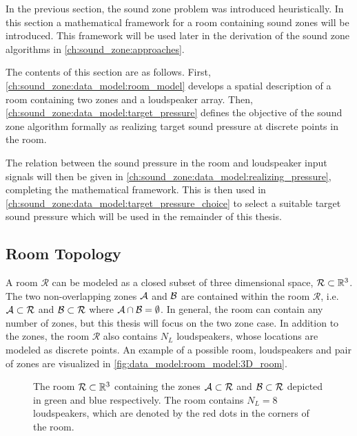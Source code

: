In the previous section, the sound zone problem was introduced heuristically.
In this section a mathematical framework for a room containing sound zones will be introduced.
This framework will be used later in the derivation of the sound zone algorithms in \autoref{ch:sound_zone:approaches}.

The contents of this section are as follows.
First, \autoref{ch:sound_zone:data_model:room_model} develops a spatial description of a room containing
two zones and a loudspeaker array.
Then, \autoref{ch:sound_zone:data_model:target_pressure} defines the objective of the sound zone algorithm formally
as realizing target sound pressure at discrete points in the room.

The relation between the sound pressure in the room and loudspeaker input signals will then be given in
\autoref{ch:sound_zone:data_model:realizing_pressure}, completing the mathematical framework.
This is then used in \autoref{ch:sound_zone:data_model:target_pressure_choice} to select a suitable target
sound pressure which will be used in the remainder of this thesis.

\subsection{Room Topology}
\label{ch:sound_zone:data_model:room_model}
A room $\mathcal{R}$ can be modeled as a closed subset of three dimensional space, $\mathcal{R} \subset \mathbb{R}^{3}$.
The two non-overlapping zones $\mathcal{A}$ and $\mathcal{B}$ are contained within the room $\mathcal{R}$, 
i.e. $\mathcal{A} \subset \mathcal{R}$ and $\mathcal{B} \subset \mathcal{R}$ where $\mathcal{A} \cap \mathcal{B} = \emptyset$.
In general, the room can contain any number of zones, but this thesis will focus on the two zone case. 
In addition to the zones, the room $\mathcal{R}$ also contains $N_L$ loudspeakers, whose locations are modeled as discrete points.
An example of a possible room, loudspeakers and pair of zones are visualized in \autoref{fig:data_model:room_model:3D_room}.

\begin{figure}
    \centering
    
    \caption{The room $\mathcal{R}\subset \mathbb{R}^{3}$ containing the zones $\mathcal{A}\subset\mathcal{R}$ 
    and $\mathcal{B}\subset\mathcal{R}$ depicted in green and blue respectively. 
    The room contains $N_L = 8$ loudspeakers, which are denoted by the red dots in the corners of the room.}
    \label{fig:data_model:room_model:3D_room}
\end{figure}

